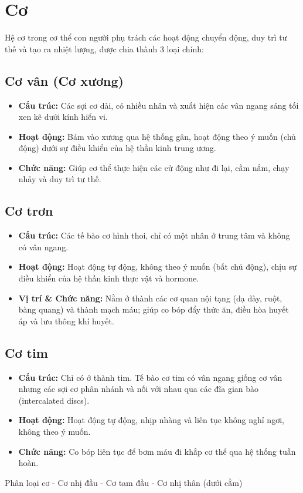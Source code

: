 \section{Cơ}

Hệ cơ trong cơ thể con người phụ trách các hoạt động chuyển động, duy trì tư thế và tạo ra nhiệt lượng, được chia thành 3 loại chính:

\subsection{Cơ vân (Cơ xương)}
\begin{itemize}
    \item \textbf{Cấu trúc:} Các sợi cơ dài, có nhiều nhân và xuất hiện các vân ngang sáng tối xen kẽ dưới kính hiển vi.
    \item \textbf{Hoạt động:} Bám vào xương qua hệ thống gân, hoạt động theo ý muốn (chủ động) dưới sự điều khiển của hệ thần kinh trung ương.
    \item \textbf{Chức năng:} Giúp cơ thể thực hiện các cử động như đi lại, cầm nắm, chạy nhảy và duy trì tư thế.
\end{itemize}

\subsection{Cơ trơn}
\begin{itemize}
    \item \textbf{Cấu trúc:} Các tế bào cơ hình thoi, chỉ có một nhân ở trung tâm và không có vân ngang.
    \item \textbf{Hoạt động:} Hoạt động tự động, không theo ý muốn (bất chủ động), chịu sự điều khiển của hệ thần kinh thực vật và hormone.
    \item \textbf{Vị trí \& Chức năng:} Nằm ở thành các cơ quan nội tạng (dạ dày, ruột, bàng quang) và thành mạch máu; giúp co bóp đẩy thức ăn, điều hòa huyết áp và lưu thông khí huyết.
\end{itemize}

\subsection{Cơ tim}
\begin{itemize}
    \item \textbf{Cấu trúc:} Chỉ có ở thành tim. Tế bào cơ tim có vân ngang giống cơ vân nhưng các sợi cơ phân nhánh và nối với nhau qua các đĩa gian bào (intercalated discs).
    \item \textbf{Hoạt động:} Hoạt động tự động, nhịp nhàng và liên tục không nghỉ ngơi, không theo ý muốn.
    \item \textbf{Chức năng:} Co bóp liên tục để bơm máu đi khắp cơ thể qua hệ thống tuần hoàn.
\end{itemize}
Phân loại cơ
- Cơ nhị đầu
- Cơ tam đầu
- Cơ nhị thân (dưới cằm)

